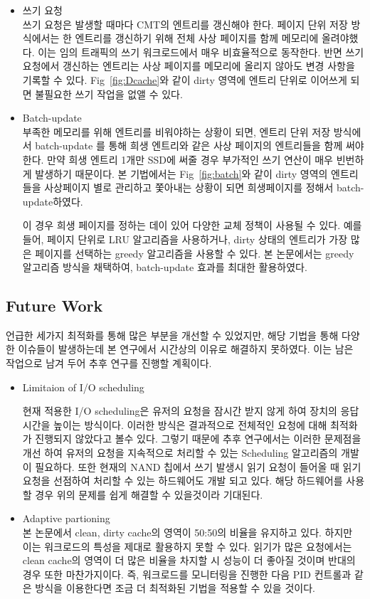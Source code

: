 \documentclass[conference]{IEEEtran}
\begin{document}
\begin{itemize}
	\item{쓰기 요청}\\
	쓰기 요청은 발생할 때마다 CMT의 엔트리를 갱신해야 한다. 페이지 단위 저장 방식에서는 한 엔트리를
	갱신하기 위해 전체 사상 페이지를 함께 메모리에 올려야했다. 이는 임의 트래픽의 쓰기 워크로드에서
	매우 비효율적으로 동작한다. 반면 쓰기 요청에서 갱신하는 엔트리는 사상 페이지를 메모리에 올리지 
	않아도 변경 사항을 기록할 수 있다. Fig~\ref{fig:Dcache}와 같이 dirty 영역에 엔트리 단위로 
	이어쓰게 되면 불필요한 쓰기 작업을 없앨 수 있다. 
	\item{Batch-update}\\
	부족한 메모리를 위해 엔트리를 비워야하는 상황이 되면, 엔트리 단위 저장 방식에서 batch-update 를
	통해 희생 엔트리와 같은 사상 페이지의 엔트리들을 함께 써야 한다. 만약 희생 엔트리 1개만 SSD에 
	써줄 경우 부가적인 쓰기 연산이 매우 빈번하게 발생하기 때문이다. 본 기법에서는 
	Fig~\ref{fig:batch}와 같이 dirty 영역의 엔트리들을 사상페이지 별로 관리하고 쫓아내는 상황이 
	되면 희생페이지를 정해서 batch-update하였다.\par

	이 경우 희생 페이지를 정하는 데이 있어 다양한 교체 정책이 사용될 수 있다. 예를 들어, 
	페이지 단위로 LRU 알고리즘을 사용하거나, dirty 상태의 엔트리가 가장 많은 페이지를 선택하는 
	greedy 알고리즘을 사용할 수 있다. 본 논문에서는 greedy 알고리즘 방식을 채택하여, 
	batch-update 효과를 최대한 활용하였다.
\end{itemize}
\subsection{Future Work}
언급한 세가지 최적화를 통해 많은 부분을 개선할 수 있었지만, 해당 기법을 통해 다양한 이슈들이 
발생하는데 본 연구에서 시간상의 이유로 해결하지 못하였다. 이는 남은 작업으로 남겨 두어 
추후 연구를 진행할 계획이다. 
\begin{itemize}
	\item{Limitaion of I/O scheduling}\par
	현재 적용한 I/O scheduling은 유저의 요청을 잠시간 받지 않게 하여 장치의 응답시간을 높이는 
	방식이다. 이러한 방식은 결과적으로 전체적인 요청에 대해 최적화가 진행되지 않았다고 볼수 있다. 
	그렇기 때문에 추후 연구에서는 이러한 문제점을 개선 하여 유저의 요청을 지속적으로 처리할 수 
	있는 Scheduling 알고리즘의 개발이 필요하다. 또한 현재의 NAND 칩에서 쓰기 발생시 읽기 요청이 
	들어올 때 읽기 요청을 선점하여 처리할 수 있는 하드웨어도 개발 되고 있다. 해당 하드웨어를 
	사용할 경우 위의 문제를 쉽게 해결할 수 있을것이라 기대된다.
	\item{Adaptive partioning}\\
	본 논문에서 clean, dirty cache의 영역이 50:50의 비율을 유지하고 있다. 하지만 이는 워크로드의 
	특성을 제대로 활용하지 못할 수 있다. 읽기가 많은 요청에서는 clean cache의 영역이 더 많은 비율을 
	차지할 시 성능이 더 좋아질 것이며 반대의 경우 또한 마찬가지이다. 즉, 워크로드를 모니터링을 
	진행한 다음 PID 컨트롤과 같은 방식을 이용한다면 조금 더 최적화된 기법을 적용할 수 있을 것이다.
\end{itemize}
\end{document}

